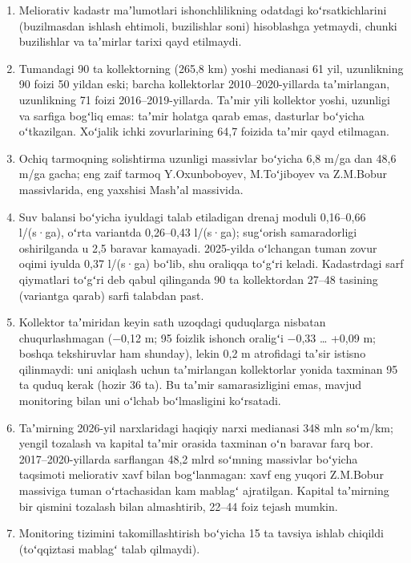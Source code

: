 \documentclass[14pt,a4paper,oneside]{extreport}
\providecommand{\tightlist}{\setlength{\itemsep}{0pt}\setlength{\parskip}{0pt}}
\begin{document}
\begin{enumerate}
\def\labelenumi{\arabic{enumi}.}
\tightlist
\item
  Meliorativ kadastr maʼlumotlari ishonchlilikning odatdagi
  koʻrsatkichlarini (buzilmasdan ishlash ehtimoli, buzilishlar soni)
  hisoblashga yetmaydi, chunki buzilishlar va taʼmirlar tarixi qayd
  etilmaydi.
\item
  Tumandagi 90 ta kollektorning (265,8 km) yoshi medianasi 61 yil,
  uzunlikning 90 foizi 50 yildan eski; barcha kollektorlar
  2010--2020-yillarda taʼmirlangan, uzunlikning 71 foizi
  2016--2019-yillarda. Taʼmir yili kollektor yoshi, uzunligi va sarfiga
  bogʻliq emas: taʼmir holatga qarab emas, dasturlar boʻyicha
  oʻtkazilgan. Xoʻjalik ichki zovurlarining 64,7 foizida taʼmir qayd
  etilmagan.
\item
  Ochiq tarmoqning solishtirma uzunligi massivlar boʻyicha 6,8 m/ga dan
  48,6 m/ga gacha; eng zaif tarmoq Y.Oxunboboyev, M.Toʻjiboyev va
  Z.M.Bobur massivlarida, eng yaxshisi Mashʼal massivida.
\item
  Suv balansi boʻyicha iyuldagi talab etiladigan drenaj moduli
  0,16--0,66 l/(s·ga), oʻrta variantda 0,26--0,43 l/(s·ga); sugʻorish
  samaradorligi oshirilganda u 2,5 baravar kamayadi. 2025-yilda
  oʻlchangan tuman zovur oqimi iyulda 0,37 l/(s·ga) boʻlib, shu oraliqqa
  toʻgʻri keladi. Kadastrdagi sarf qiymatlari toʻgʻri deb qabul
  qilinganda 90 ta kollektordan 27--48 tasining (variantga qarab) sarfi
  talabdan past.
\item
  Kollektor taʼmiridan keyin sath uzoqdagi quduqlarga nisbatan
  chuqurlashmagan (−0,12 m; 95 foizlik ishonch oraligʻi −0,33 \ldots{}
  +0,09 m; boshqa tekshiruvlar ham shunday), lekin 0,2 m atrofidagi
  taʼsir istisno qilinmaydi: uni aniqlash uchun taʼmirlangan
  kollektorlar yonida taxminan 95 ta quduq kerak (hozir 36 ta). Bu
  taʼmir samarasizligini emas, mavjud monitoring bilan uni oʻlchab
  boʻlmasligini koʻrsatadi.
\item
  Taʼmirning 2026-yil narxlaridagi haqiqiy narxi medianasi 348 mln
  soʻm/km; yengil tozalash va kapital taʼmir orasida taxminan oʻn
  baravar farq bor. 2017--2020-yillarda sarflangan 48,2 mlrd soʻmning
  massivlar boʻyicha taqsimoti meliorativ xavf bilan bogʻlanmagan: xavf
  eng yuqori Z.M.Bobur massiviga tuman oʻrtachasidan kam mablagʻ
  ajratilgan. Kapital taʼmirning bir qismini tozalash bilan almashtirib,
  22--44 foiz tejash mumkin.
\item
  Monitoring tizimini takomillashtirish boʻyicha 15 ta tavsiya ishlab
  chiqildi (toʻqqiztasi mablagʻ talab qilmaydi).
\end{enumerate}
\end{document}
